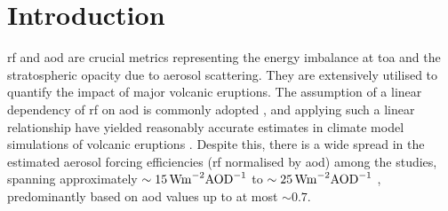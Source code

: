 \documentclass{ametsocV6.1}
\begin{document}

\section{Introduction}



\Gls{rf} and \gls{aod} are crucial metrics representing the energy imbalance at
\gls{toa} and the stratospheric opacity due to aerosol scattering. They are extensively
utilised to quantify the impact of major volcanic eruptions. The assumption of a linear
dependency of \gls{rf} on \gls{aod} is commonly adopted \citep{myhre2013,andersson2015},
and applying such a linear relationship have yielded reasonably accurate estimates in
climate model simulations of volcanic eruptions
\citep{mills2017,hansen2005,gregory2016,marshall2020,pitari2016b}. Despite this, there
is a wide spread in the estimated aerosol forcing efficiencies (\gls{rf} normalised by
\gls{aod}) among the studies, spanning approximately \(\sim
\SI{15}{\watt\metre^{-2}\ce{AOD}^{-1}}\) \citep{pitari2016b} to \(\sim
\SI{25}{\watt\metre^{-2}\ce{AOD}^{-1}}\) \citep{myhre2013}, predominantly based on
\gls{aod} values up to at most \(\sim 0.7\).
\end{document}
